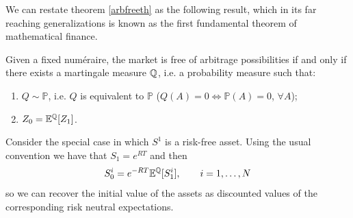 We can restate theorem \ref{arbfreeth} as the following result, which in its far reaching generalizations is known as the first fundamental theorem of mathematical finance.
\begin{theorem}
    Given a fixed numéraire, the market is free of arbitrage possibilities if and only if there exists a martingale measure ${\mathbb{Q}}$, i.e. a probability measure such that:
    \begin{enumerate}
        \item $Q\sim \mathbb{P}$, i.e. $Q$ is equivalent to $\mathbb{P}$ ($Q(A)=0\Leftrightarrow \mathbb{P}(A)=0$, $\forall A$);
        \item $Z_0 = \mathbb{E}^{\mathbb{Q}}[Z_1]$.
    \end{enumerate}
\end{theorem}
\begin{remark}
    Consider the special case in which $S^1$ is a risk-free asset. Using the usual convention we have that $S_1 = e^{RT}$ and then
    \begin{equation*}
        S_0^i = e^{-RT}\mathbb{E}^{\mathbb{Q}}[S_1^i], \qquad i = 1,\dots,N
    \end{equation*}
    so we can recover the initial value of the assets as discounted values of the corresponding risk neutral expectations.
\end{remark}

